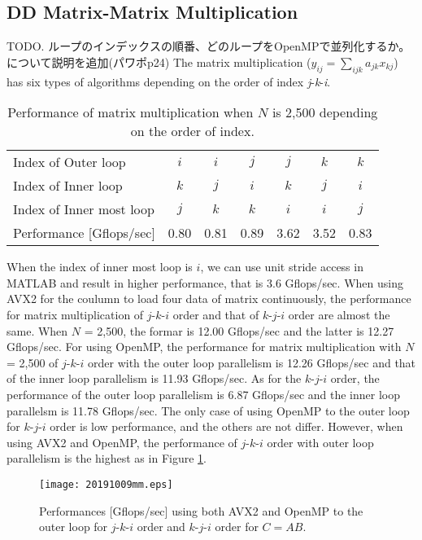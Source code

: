 \documentclass{IOS-Book-Article}
\begin{document}
\subsection{DD Matrix-Matrix Multiplication}
TODO. ループのインデックスの順番、どのループをOpenMPで並列化するか。について説明を追加(パワポp24)
The matrix multiplication ($y_{ij}=\sum_{ijk} a_{jk}x_{kj}$) has six types of algorithms depending on the order of index {\it j}-{\it k}-{\it i}.
\begin{table}[htbp]
  \centering
  \caption{Performance of matrix multiplication when $N$ is 2,500 depending on the order of index.}
  \label{mmindx}
  \small
  \begin{tabular}{l|cccccc}
    \hline
  Index of Outer loop          & $i$    & $i$    & $j$    & $j$    & $k$    & $k$    \\
  Index of Inner loop          & $k$    & $j$    & $i$    & $k$    & $j$    & $i$    \\
  Index of Inner most loop     & $j$    & $k$    & $k$    & $i$    & $i$    & $j$    \\
  Performance {[}Gflops/sec{]} &  0.80  &  0.81  &  0.89  &  3.62  &  3.52  & 0.83
  \\ \hline
  \end{tabular}
\end{table}

When the index of inner most loop is $i$, we can use unit stride access in MATLAB and result in higher performance, that is 3.6 Gflops/sec.
When using AVX2 for the coulumn to load four data of matrix continuously, the performance for matrix multiplication of $j$-$k$-$i$ order and that of $k$-$j$-$i$ order are almost the same.
When $N$ = 2,500, the formar is 12.00 Gflops/sec and the latter is 12.27 Gflops/sec.
For using OpenMP, the performance for matrix multiplication with $N$ = 2,500 of $j$-$k$-$i$ order with the outer loop parallelism is 12.26 Gflops/sec
and that of the inner loop parallelism is 11.93 Gflops/sec.
As for the $k$-$j$-$i$ order, the performance of the outer loop parallelism is 6.87 Gflops/sec and the inner loop parallelsm is 11.78 Gflops/sec.
The only case of using OpenMP to the outer loop for $k$-$j$-$i$ order is low performance, and the others are not differ.
However, when using AVX2 and OpenMP, the performance of $j$-$k$-$i$ order with outer loop parallelism is the highest as in Figure \ref{figMM3}. 

\begin{figure}[htbp]
  \begin{center}
    \texttt{[image: 20191009mm.eps]}
         \caption{Performances [Gflops/sec] using both AVX2 and OpenMP to the outer loop for $j$-$k$-$i$ order and $k$-$j$-$i$ order for $C = AB$.}
    \label{figMM3}
  \end{center}
\end{figure}
\end{document}

